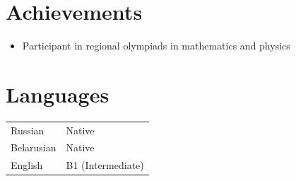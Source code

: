 \documentclass[a4paper,11pt]{article}
\begin{document}
\section{Achievements}
\begin{itemize}[leftmargin=1.2em, itemsep=2pt]
    \item Participant in regional olympiads in mathematics and physics
\end{itemize}
\section{Languages}
\begin{tabularx}{\linewidth}{@{}l X@{}}
Russian & Native \\
Belarusian & Native \\
English & B1 (Intermediate) \\
\end{tabularx}
\end{document}

